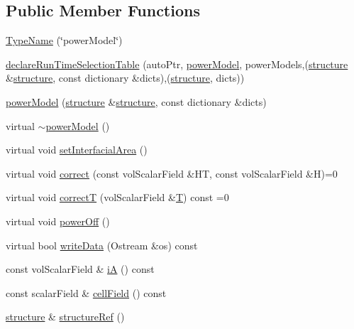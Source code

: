 \subsection*{Public Member Functions}
\begin{DoxyCompactItemize}
\item 
\hyperlink{classFoam_1_1powerModel_a81bedb0fc305f189b4577fd4887a8dca}{Type\+Name} (\char`\"{}power\+Model\char`\"{})
\item 
\hyperlink{classFoam_1_1powerModel_a8255178420aa8e11d003671d4a2637b3}{declare\+Run\+Time\+Selection\+Table} (auto\+Ptr, \hyperlink{classFoam_1_1powerModel}{power\+Model}, power\+Models,(\hyperlink{classFoam_1_1structure}{structure} \&\hyperlink{classFoam_1_1structure}{structure}, const dictionary \&dicts),(\hyperlink{classFoam_1_1structure}{structure}, dicts))
\item 
\hyperlink{classFoam_1_1powerModel_a520f94004c06f33d7e1de07bc3fbb55a}{power\+Model} (\hyperlink{classFoam_1_1structure}{structure} \&\hyperlink{classFoam_1_1structure}{structure}, const dictionary \&dicts)
\item 
virtual \hyperlink{classFoam_1_1powerModel_adf641cca3e70d27f1feb873677637591}{$\sim$power\+Model} ()
\item 
virtual void \hyperlink{classFoam_1_1powerModel_a8fc8c05c610e629783c80688340f8db4}{set\+Interfacial\+Area} ()
\item 
virtual void \hyperlink{classFoam_1_1powerModel_a94e543602e416ccbc721750143e2cd73}{correct} (const vol\+Scalar\+Field \&HT, const vol\+Scalar\+Field \&H)=0
\item 
virtual void \hyperlink{classFoam_1_1powerModel_a8ddbd4b794b55aa27a95e5cd8db62f25}{correctT} (vol\+Scalar\+Field \&\hyperlink{EEqn__1pl_8H_ad0f94aa7ea43d4be0bae24e3a89aad0c}{T}) const =0
\item 
virtual void \hyperlink{classFoam_1_1powerModel_a92d1e5ca9cc82f5db7a01d66a3a913a7}{power\+Off} ()
\item 
virtual bool \hyperlink{classFoam_1_1powerModel_a73ace448c639d2e1c943852abe89af7c}{write\+Data} (Ostream \&os) const
\item 
const vol\+Scalar\+Field \& \hyperlink{classFoam_1_1powerModel_ae2c1c1e4f41f42a4dd77007cb706089c}{iA} () const
\item 
const scalar\+Field \& \hyperlink{classFoam_1_1powerModel_ae8f5b544e0f8476f028acef828b4dcb2}{cell\+Field} () const
\item 
\hyperlink{classFoam_1_1structure}{structure} \& \hyperlink{classFoam_1_1powerModel_aa5041e12a8edbcdfa4effcbd1b793cfb}{structure\+Ref} ()
\end{DoxyCompactItemize}
